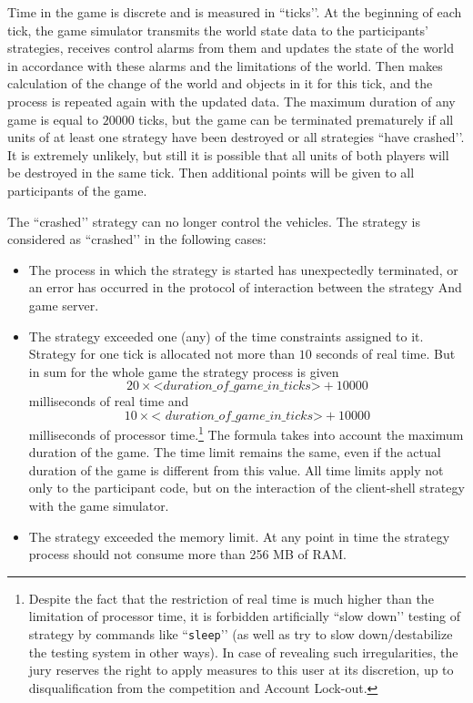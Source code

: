 Time in the game is discrete and is measured in ``ticks’’. At the beginning of each tick, the game simulator transmits the world state data to the participants' strategies,
receives control alarms from them and updates the state of the world in accordance with these alarms and the limitations of the world. Then makes
calculation of the change of the world and objects in it for this tick, and the process is repeated again with the updated data. The maximum duration of any game
is equal to $20000$ ticks, but the game can be terminated prematurely if all units of at least one strategy have been destroyed or all strategies
``have crashed’’. It is extremely unlikely, but still it is possible that all units of both players will be destroyed in the same tick. Then additional
points will be given to all participants of the game.

The ``crashed’’ strategy can no longer control the vehicles. The strategy is considered as ``crashed’’ in the following cases:
\begin{itemize}
  \item The process in which the strategy is started has unexpectedly terminated, or an error has occurred in the protocol of interaction between the strategy
        And game server.
  \item The strategy exceeded one (any) of the time constraints assigned to it. Strategy for one tick is allocated not more than $10$ seconds
        of real time. But in sum for the whole game the strategy process is given
        \begin{equation}
        20\times\textit{<duration\_of\_game\_in\_ticks>}+10000
        \end{equation}
        milliseconds of real time and
        \begin{equation}
        10\times\textit{< duration\_of\_game\_in\_ticks>}+10000
        \end{equation}
        milliseconds of processor time.\footnote[1]{Despite the fact that the restriction of real time is much higher than the limitation
        of processor time, it is forbidden artificially ``slow down’’ testing of strategy by commands like ``\texttt{sleep}’’ (as well as
        try to slow down/destabilize the testing system in other ways). In case of revealing such irregularities, the jury
        reserves the right to apply measures to this user at its discretion, up to disqualification from the competition and
        Account Lock-out.} The formula takes into account the maximum duration of the game. The time limit remains the same, even if
        the actual duration of the game is different from this value. All time limits apply not only to the participant code, but
        on the interaction of the client-shell strategy with the game simulator.
  \item The strategy exceeded the memory limit. At any point in time the strategy process should not consume more than 256 MB of RAM.
\end{itemize}


